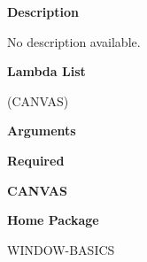  
{\bf Description}

No description available.

 
{\bf Lambda List}

(CANVAS)

 
{\bf Arguments}


\beginhang
{\bf Required}\hspace{2em}
 
{\bf CANVAS}


 
\endhang
 
{\bf Home Package}

WINDOW-BASICS


